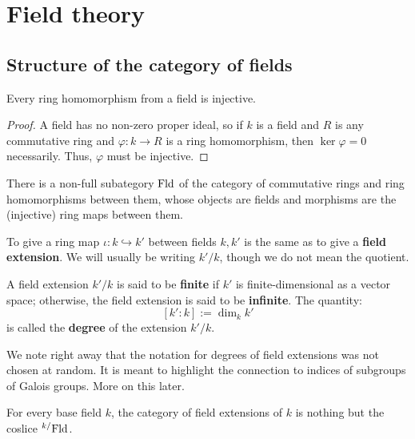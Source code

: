 \section{Field theory}
    \subsection{Structure of the category of fields}
        \begin{lemma} \label{lemma: ring_maps_from_fields_are_injective}
            Every ring homomorphism from a field is injective.
        \end{lemma}
            \begin{proof}
                A field has no non-zero proper ideal, so if $k$ is a field and $R$ is any commutative ring and $\varphi: k \to R$ is a ring homomorphism, then $\ker \varphi = 0$ necessarily. Thus, $\varphi$ must be injective.  
            \end{proof}
        \begin{corollary}
            There is a non-full subategory $\mathrm{Fld}$ of the category of commutative rings and ring homomorphisms between them, whose objects are fields and morphisms are the (injective) ring maps between them. 
        \end{corollary}

        \begin{definition} \label{def: field_extensions}
            To give a ring map $\iota: k \hookrightarrow k'$ between fields $k, k'$ is the same as to give a \textbf{field extension}. We will usually be writing $k'/k$, though we do not mean the quotient.
            
            A field extension $k'/k$ is said to be \textbf{finite} if $k'$ is finite-dimensional as a vector space; otherwise, the field extension is said to be \textbf{infinite}. The quantity:
                $$[k' : k] := \dim_k k'$$
            is called the \textbf{degree} of the extension $k'/k$.
        \end{definition}
        We note right away that the notation for degrees of field extensions was not chosen at random. It is meant to highlight the connection to indices of subgroups of Galois groups. More on this later.
        \begin{remark}
            For every base field $k$, the category of field extensions of $k$ is nothing but the coslice ${}^{k/}\mathrm{Fld}$.
        \end{remark}

